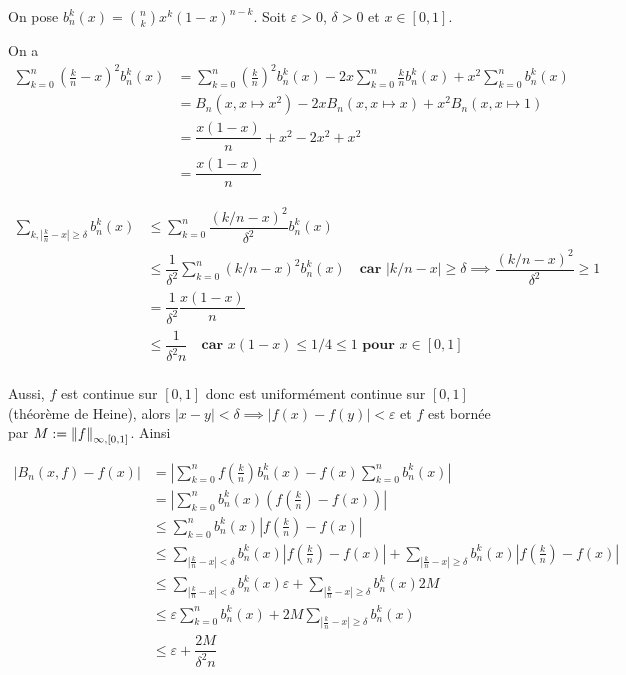 \documentclass[a4paper,12pt]{article}
\begin{document}
\begin{demonstration}
    On pose $b_n^k(x) = \binom{n}{k} x^k (1-x)^{n-k}$.
    Soit $\varepsilon > 0$, $\delta > 0$ et $x \in [0, 1]$.

    On a
    \begin{align*}
        \sum_{k=0}^n \left(\frac{k}{n} - x \right)^2 b_n^k(x) &= \sum_{k=0}^n \left(\frac{k}{n}\right)^2 b_n^k(x) - 2x \sum_{k=0}^n \frac{k}{n} b_n^k(x) + x^2 \sum_{k=0}^n b_n^k(x) \\
        &= B_n(x, x \mapsto x^2) - 2x B_n(x, x \mapsto x) + x^2 B_n(x, x \mapsto 1) \\
        &= \dfrac{x(1-x)}{n} + x^2 - 2x^2 + x^2 \\
        &= \dfrac{x(1-x)}{n}
    \end{align*}

    \begin{align*}
        \sum_{k, |\frac{k}{n} - x| \geq \delta} b_n^k(x) &\leq \sum_{k=0}^n \dfrac{(k/n - x)^2}{\delta^2} b_n^k(x) \\
        &\leq \dfrac{1}{\delta^2} \sum_{k=0}^n (k/n - x)^2 b_n^k(x) \quad \textbf{car $|k/n - x| \geq \delta \implies \dfrac{(k/n - x)^2}{\delta^2} \geq 1$}\\
        &= \dfrac{1}{\delta^2} \dfrac{x(1-x)}{n} \\
        &\leq \dfrac{1}{\delta^2 n} \quad \textbf{car $x(1-x) \leq 1/4 \leq 1$ pour $x \in [0, 1]$} \\
    \end{align*}

    Aussi, $f$ est continue sur $[0, 1]$ donc est uniformément continue sur $[0, 1]$ (théorème de Heine), alors $|x - y| < \delta \implies |f(x) - f(y)| < \varepsilon$ et $f$ est bornée par $M := \left\lVert f\right\rVert_{\infty, [0, 1]}$.
    Ainsi

    \begin{align*}
        |B_n(x, f) - f(x)| &= \left| \sum_{k=0}^n f\left( \frac{k}{n} \right) b_n^k(x) - f(x) \sum_{k=0}^n b_n^k(x) \right| \\
        &= \left| \sum_{k=0}^n b_n^k(x) \left( f\left( \frac{k}{n} \right) - f(x) \right) \right| \\
        &\leq \sum_{k=0}^n b_n^k(x) \left| f\left( \frac{k}{n} \right) - f(x) \right| \\
        &\leq \sum_{|\frac{k}{n} - x| < \delta} b_n^k(x) \left| f\left( \frac{k}{n} \right) - f(x) \right| + \sum_{|\frac{k}{n} - x| \geq \delta} b_n^k(x) \left| f\left( \frac{k}{n} \right) - f(x) \right| \\
        &\leq \sum_{|\frac{k}{n} - x| < \delta} b_n^k(x) \varepsilon + \sum_{|\frac{k}{n} - x| \geq \delta} b_n^k(x) 2M \\
        &\leq \varepsilon \sum_{k=0}^n b_n^k(x) + 2M \sum_{|\frac{k}{n} - x| \geq \delta} b_n^k(x) \\
        &\leq \varepsilon + \dfrac{2M}{\delta^2 n} \
    \end{align*}


\end{demonstration}
\end{document}
